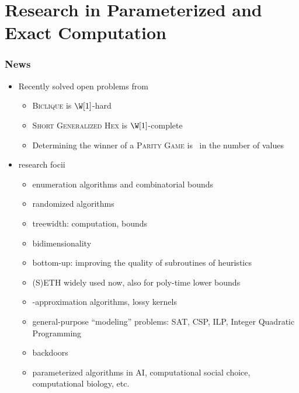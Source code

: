 \section{Research in Parameterized and Exact Computation}

\begin{frame}
 \frametitle{News}
 
 \begin{itemize}
  \item Recently solved open problems from \cite{DowneyF13}
  \begin{itemize}
  	\item \textsc{Biclique} is $\W[1]$-hard \cite{Lin18}
  	\item \textsc{Short Generalized Hex} is $\W[1]$-complete \cite{BonnetGLRS17}
  	\item Determining the winner of a \textsc{Parity Game} is \FPT\ in the number of values \cite{CaludeJKL017}
  \end{itemize}
  \item research focii
  \begin{itemize}
   \item enumeration algorithms and combinatorial bounds
   \item randomized algorithms
   \item treewidth: computation, bounds %
   \item bidimensionality
   \item bottom-up: improving the quality of subroutines of heuristics
   \item (S)ETH widely used now, also for poly-time lower bounds
   \item \FPT-approximation algorithms, lossy kernels
   \item general-purpose ``modeling'' problems: SAT, CSP, ILP, Integer Quadratic Programming
   \item backdoors
   \item parameterized algorithms in AI, computational social choice, computational biology, etc.
  \end{itemize}
 \end{itemize}

\end{frame}

